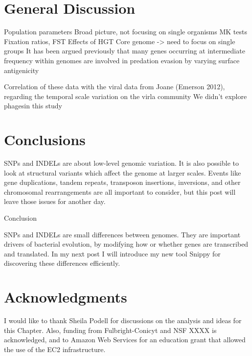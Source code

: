 
\clearpage
\section{General Discussion}
Population parameters
Broad picture, not focusing on single organisms
MK tests
Fixation ratios, FST
Effects of HGT
Core genome -> need to focus on single groups
It has been argued previously that many genes occurring at intermediate frequency within genomes are involved in predation evasion by varying surface antigenicity 

Correlation of these data with the viral data from Joane (Emerson 2012), regarding the temporal scale variation on the virla community
We didn't explore phagesin this study


\section{Conclusions}

SNPs and INDELs are about low-level genomic variation. It is also possible to look at structural variants which affect the genome at larger scales. Events like gene duplications, tandem repeats, transposon insertions, inversions, and other chromosomal rearrangements are all important to consider, but this post will leave those issues for another day.

Conclusion

SNPs and INDELs are small differences between genomes. They are important drivers of bacterial evolution, by modifying how or whether genes are transcribed and translated. In my next post I will introduce my new tool Snippy for discovering these differences efficiently.

\section{Acknowledgments}
I would like to thank Sheila Podell for discussions on the analysis and ideas for this Chapter. Also, funding from Fulbright-Conicyt and NSF XXXX is acknowledged, and to Amazon Web Services for an education grant that allowed the use of the EC2 infrastructure.


